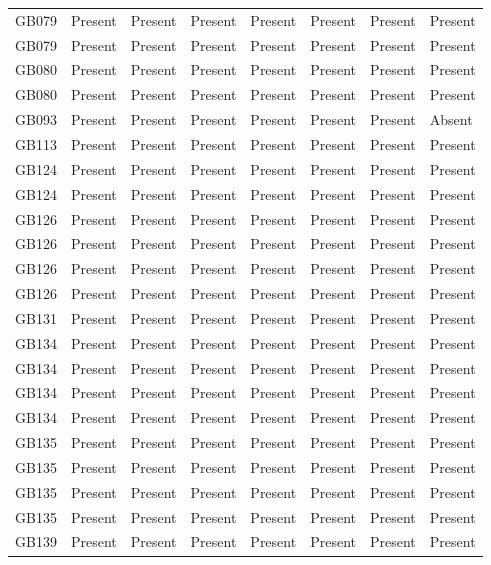 \begin{longtable}{p{1.5cm}p{2.5cm}p{2.5cm}p{2.5cm}p{2.5cm}p{2.5cm}p{2.5cm}p{2.5cm}}
  GB079 & Present & Present & Present & Present & Present & Present & Present \\ 
  GB079 & Present & Present & Present & Present & Present & Present & Present \\ 
  GB080 & Present & Present & Present & Present & Present & Present & Present \\ 
  GB080 & Present & Present & Present & Present & Present & Present & Present \\ 
  GB093 & Present & Present & Present & Present & Present & Present & Absent \\ 
  GB113 & Present & Present & Present & Present & Present & Present & Present \\ 
  GB124 & Present & Present & Present & Present & Present & Present & Present \\ 
  GB124 & Present & Present & Present & Present & Present & Present & Present \\ 
  GB126 & Present & Present & Present & Present & Present & Present & Present \\ 
  GB126 & Present & Present & Present & Present & Present & Present & Present \\ 
  GB126 & Present & Present & Present & Present & Present & Present & Present \\ 
  GB126 & Present & Present & Present & Present & Present & Present & Present \\ 
  GB131 & Present & Present & Present & Present & Present & Present & Present \\ 
  GB134 & Present & Present & Present & Present & Present & Present & Present \\ 
  GB134 & Present & Present & Present & Present & Present & Present & Present \\ 
  GB134 & Present & Present & Present & Present & Present & Present & Present \\ 
  GB134 & Present & Present & Present & Present & Present & Present & Present \\ 
  GB135 & Present & Present & Present & Present & Present & Present & Present \\ 
  GB135 & Present & Present & Present & Present & Present & Present & Present \\ 
  GB135 & Present & Present & Present & Present & Present & Present & Present \\ 
  GB135 & Present & Present & Present & Present & Present & Present & Present \\ 
  GB139 & Present & Present & Present & Present & Present & Present & Present \\ 

\end{longtable}
